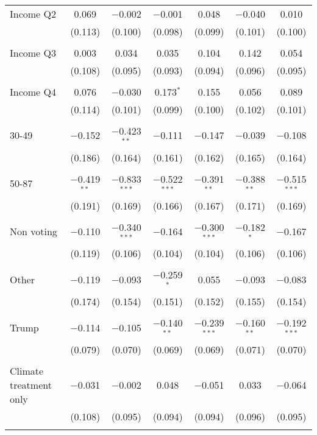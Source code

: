 \begin{tabular}{@{\extracolsep{5pt}}lcccccc}
 Income Q2 & 0.069 & $-$0.002 & $-$0.001 & 0.048 & $-$0.040 & 0.010 \\ 
  & (0.113) & (0.100) & (0.098) & (0.099) & (0.101) & (0.100) \\ 
  & & & & & & \\ 
 Income Q3 & 0.003 & 0.034 & 0.035 & 0.104 & 0.142 & 0.054 \\ 
  & (0.108) & (0.095) & (0.093) & (0.094) & (0.096) & (0.095) \\ 
  & & & & & & \\ 
 Income Q4 & 0.076 & $-$0.030 & 0.173$^{*}$ & 0.155 & 0.056 & 0.089 \\ 
  & (0.114) & (0.101) & (0.099) & (0.100) & (0.102) & (0.101) \\ 
  & & & & & & \\ 
 30-49 & $-$0.152 & $-$0.423$^{**}$ & $-$0.111 & $-$0.147 & $-$0.039 & $-$0.108 \\ 
  & (0.186) & (0.164) & (0.161) & (0.162) & (0.165) & (0.164) \\ 
  & & & & & & \\ 
 50-87 & $-$0.419$^{**}$ & $-$0.833$^{***}$ & $-$0.522$^{***}$ & $-$0.391$^{**}$ & $-$0.388$^{**}$ & $-$0.515$^{***}$ \\ 
  & (0.191) & (0.169) & (0.166) & (0.167) & (0.171) & (0.169) \\ 
  & & & & & & \\ 
 Non voting & $-$0.110 & $-$0.340$^{***}$ & $-$0.164 & $-$0.300$^{***}$ & $-$0.182$^{*}$ & $-$0.167 \\ 
  & (0.119) & (0.106) & (0.104) & (0.104) & (0.106) & (0.106) \\ 
  & & & & & & \\ 
 Other & $-$0.119 & $-$0.093 & $-$0.259$^{*}$ & 0.055 & $-$0.093 & $-$0.083 \\ 
  & (0.174) & (0.154) & (0.151) & (0.152) & (0.155) & (0.154) \\ 
  & & & & & & \\ 
 Trump & $-$0.114 & $-$0.105 & $-$0.140$^{**}$ & $-$0.239$^{***}$ & $-$0.160$^{**}$ & $-$0.192$^{***}$ \\ 
  & (0.079) & (0.070) & (0.069) & (0.069) & (0.071) & (0.070) \\ 
  & & & & & & \\ 
 Climate treatment only & $-$0.031 & $-$0.002 & 0.048 & $-$0.051 & 0.033 & $-$0.064 \\ 
  & (0.108) & (0.095) & (0.094) & (0.094) & (0.096) & (0.095) \\ 
  & & & & & & \\ 

\end{tabular}
